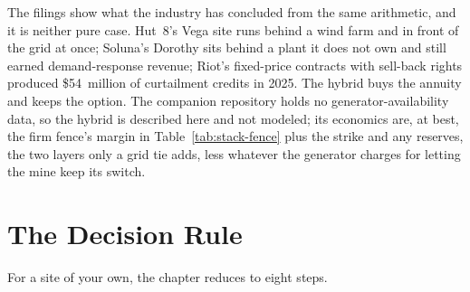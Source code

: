 The filings show what the industry has concluded from the same arithmetic, and it is neither pure case. Hut~8's Vega site runs behind a wind farm and in front of the grid at once; Soluna's Dorothy sits behind a plant it does not own and still earned demand-response revenue; Riot's fixed-price contracts with sell-back rights produced \$54~million of curtailment credits in 2025. %
The hybrid buys the annuity and keeps the option. The companion repository holds no generator-availability data, so the hybrid is described here and not modeled; its economics are, at best, the firm fence's margin in Table~\ref{tab:stack-fence} plus the strike and any reserves, the two layers only a grid tie adds, less whatever the generator charges for letting the mine keep its switch. %

\section{The Decision Rule}
\label{sec:stack-rule}

\enlargethispage{2\baselineskip}
For a site of your own, the chapter reduces to eight steps.

